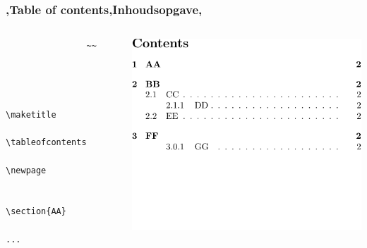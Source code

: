 \begin{frame}[fragile]
    \frametitle{\lang,Table of contents,Inhoudsopgave,}
    
    \begin{columns}
        \begin{column}{0.5\textwidth}
            \begin{codebox}
            \begin{verbatim}
                ~~

                
                
                    \maketitle
                    \tableofcontents
                    \newpage
                    
                    \section{AA}
                    ...
                
            \end{verbatim}
            \end{codebox}
        \end{column}
        \begin{column}{0.5\textwidth}
            \includegraphics[width=\linewidth,height=0.8\textheight,keepaspectratio,page=1]{assets/tableofcontentswholepage.pdf}
            \vspace{-60pt}
        \end{column}
    \end{columns}
\end{frame}

